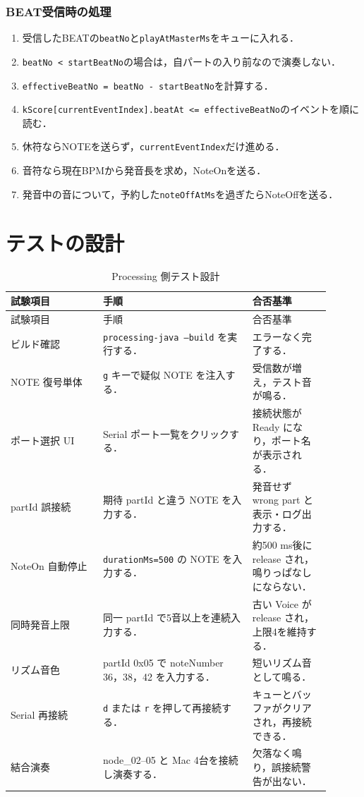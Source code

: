 \documentclass[lualatex,book,paper=a4paper,jafontsize=11.5pt,jafontscale=1.05]{jlreq}
\newcommand{\code}[1]{\texttt{#1}}
\begin{document}
\subsubsection{BEAT受信時の処理}

\begin{enumerate}
  \item 受信したBEATの\code{beatNo}と\code{playAtMasterMs}をキューに入れる．
  \item \code{beatNo < startBeatNo}の場合は，自パートの入り前なので演奏しない．
  \item \code{effectiveBeatNo = beatNo - startBeatNo}を計算する．
  \item \code{kScore[currentEventIndex].beatAt <= effectiveBeatNo}のイベントを順に読む．
  \item 休符ならNOTEを送らず，\code{currentEventIndex}だけ進める．
  \item 音符なら現在BPMから発音長を求め，NoteOnを送る．
  \item 発音中の音について，予約した\code{noteOffAtMs}を過ぎたらNoteOffを送る．
\end{enumerate}

\section{テストの設計}
\begin{longtable}{p{0.26\linewidth}p{0.42\linewidth}p{0.22\linewidth}}
\caption{Processing 側テスト設計}\label{tab:tests}\\
\toprule
試験項目 & 手順 & 合否基準 \\
\midrule
\endfirsthead
\toprule
試験項目 & 手順 & 合否基準 \\
\midrule
\endhead
ビルド確認 & \texttt{processing-java --build} を実行する． & エラーなく完了する． \\
NOTE 復号単体 & \texttt{g} キーで疑似 NOTE を注入する． & 受信数が増え，テスト音が鳴る． \\
ポート選択 UI & Serial ポート一覧をクリックする． & 接続状態が Ready になり，ポート名が表示される． \\
partId 誤接続 & 期待 partId と違う NOTE を入力する． & 発音せず wrong part と表示・ログ出力する． \\
NoteOn 自動停止 & \texttt{durationMs=500} の NOTE を入力する． & 約500 ms後に release され，鳴りっぱなしにならない． \\
同時発音上限 & 同一 partId で5音以上を連続入力する． & 古い Voice が release され，上限4を維持する． \\
リズム音色 & partId 0x05 で noteNumber 36，38，42 を入力する． & 短いリズム音として鳴る． \\
Serial 再接続 & \texttt{d} または \texttt{r} を押して再接続する． & キューとバッファがクリアされ，再接続できる． \\
結合演奏 & node\_02--05 と Mac 4台を接続し演奏する． & 欠落なく鳴り，誤接続警告が出ない． \\
\bottomrule
\end{longtable}
\end{document}
